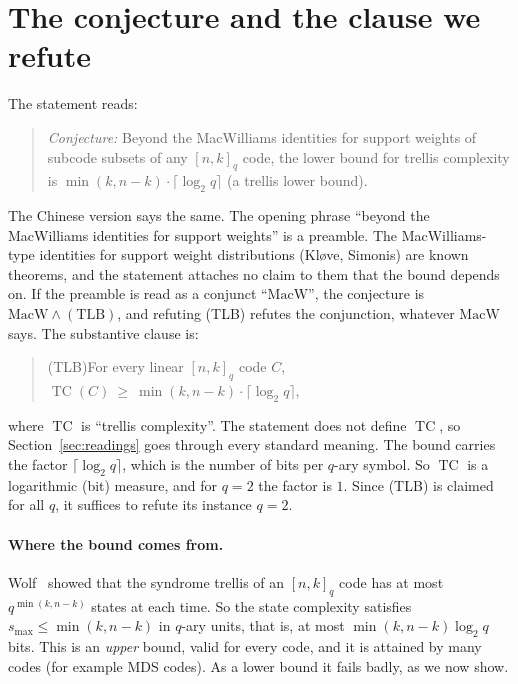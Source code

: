 \documentclass[11pt]{article}
\theoremstyle{definition}
\theoremstyle{remark}
\newcommand{\smax}{s_{\max}}
\begin{document}
\section{The conjecture and the clause we refute}
The statement reads:
\begin{quote}
\emph{Conjecture:} Beyond the MacWilliams identities for support weights of
subcode subsets of any $[n,k]_q$ code, the lower bound for trellis complexity is
$\min(k,n-k)\cdot\lceil\log_2 q\rceil$ (a trellis lower bound).
\end{quote}
The Chinese version says the same. The opening phrase ``beyond the MacWilliams
identities for support weights'' is a preamble. The MacWilliams-type identities
for support weight distributions (Kl{\o}ve, Simonis) are known theorems, and the
statement attaches no claim to them that the bound depends on. If the preamble is
read as a conjunct ``$\mathrm{MacW}$'', the conjecture is
$\mathrm{MacW}\wedge(\mathrm{TLB})$, and refuting (TLB) refutes the conjunction,
whatever $\mathrm{MacW}$ says. The substantive clause is:
\begin{quote}
(TLB)\quad For every linear $[n,k]_q$ code $C$,\quad
$\operatorname{TC}(C)\ \ge\ \min(k,n-k)\cdot\lceil\log_2 q\rceil$,
\end{quote}
where $\operatorname{TC}$ is ``trellis complexity''. The statement does not define
$\operatorname{TC}$, so Section~\ref{sec:readings} goes through every standard
meaning. The bound carries the factor $\lceil\log_2 q\rceil$, which is the number of
bits per $q$-ary symbol. So $\operatorname{TC}$ is a logarithmic (bit) measure, and
for $q=2$ the factor is $1$. Since (TLB) is claimed for all $q$, it suffices to
refute its instance $q=2$.

\paragraph{Where the bound comes from.} Wolf~\cite{Wolf} showed that the syndrome
trellis of an $[n,k]_q$ code has at most $q^{\min(k,n-k)}$ states at each time.
So the state complexity satisfies $\smax\le\min(k,n-k)$ in $q$-ary units, that is,
at most $\min(k,n-k)\log_2 q$ bits. This is an \emph{upper} bound, valid for every code, and it is
attained by many codes (for example MDS codes). As a lower bound it fails badly,
as we now show.
\end{document}
